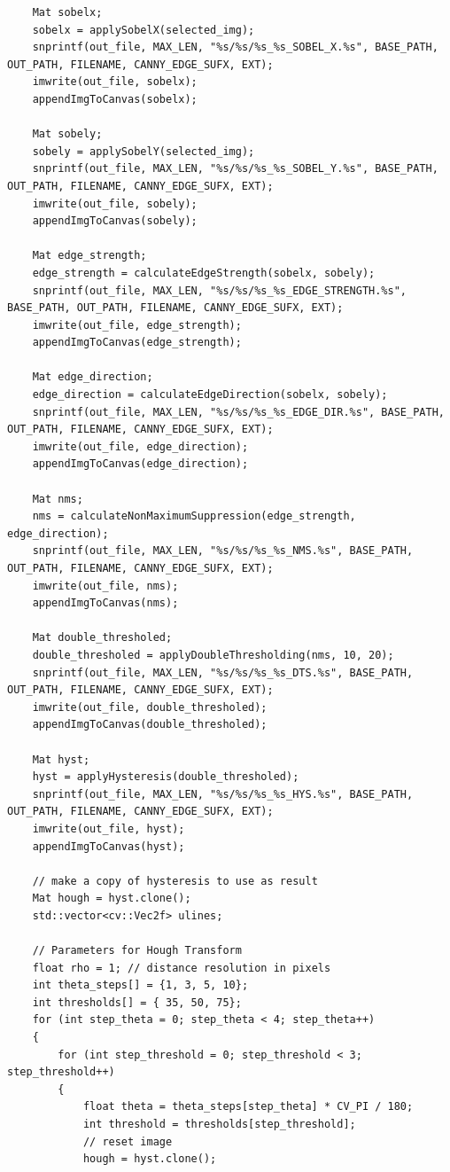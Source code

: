 \documentclass[12pt,a4paper]{report}
\begin{document}
\begin{lstlisting}
    Mat sobelx;
    sobelx = applySobelX(selected_img);
    snprintf(out_file, MAX_LEN, "%s/%s/%s_%s_SOBEL_X.%s", BASE_PATH, OUT_PATH, FILENAME, CANNY_EDGE_SUFX, EXT);
    imwrite(out_file, sobelx);
    appendImgToCanvas(sobelx);

    Mat sobely;
    sobely = applySobelY(selected_img);
    snprintf(out_file, MAX_LEN, "%s/%s/%s_%s_SOBEL_Y.%s", BASE_PATH, OUT_PATH, FILENAME, CANNY_EDGE_SUFX, EXT);
    imwrite(out_file, sobely);
    appendImgToCanvas(sobely);

    Mat edge_strength;
    edge_strength = calculateEdgeStrength(sobelx, sobely);
    snprintf(out_file, MAX_LEN, "%s/%s/%s_%s_EDGE_STRENGTH.%s", BASE_PATH, OUT_PATH, FILENAME, CANNY_EDGE_SUFX, EXT);
    imwrite(out_file, edge_strength);
    appendImgToCanvas(edge_strength);

    Mat edge_direction;
    edge_direction = calculateEdgeDirection(sobelx, sobely);
    snprintf(out_file, MAX_LEN, "%s/%s/%s_%s_EDGE_DIR.%s", BASE_PATH, OUT_PATH, FILENAME, CANNY_EDGE_SUFX, EXT);
    imwrite(out_file, edge_direction);
    appendImgToCanvas(edge_direction);

    Mat nms;
    nms = calculateNonMaximumSuppression(edge_strength, edge_direction);
    snprintf(out_file, MAX_LEN, "%s/%s/%s_%s_NMS.%s", BASE_PATH, OUT_PATH, FILENAME, CANNY_EDGE_SUFX, EXT);
    imwrite(out_file, nms);
    appendImgToCanvas(nms);

    Mat double_thresholed;
    double_thresholed = applyDoubleThresholding(nms, 10, 20);
    snprintf(out_file, MAX_LEN, "%s/%s/%s_%s_DTS.%s", BASE_PATH, OUT_PATH, FILENAME, CANNY_EDGE_SUFX, EXT);
    imwrite(out_file, double_thresholed);
    appendImgToCanvas(double_thresholed);

    Mat hyst;
    hyst = applyHysteresis(double_thresholed);
    snprintf(out_file, MAX_LEN, "%s/%s/%s_%s_HYS.%s", BASE_PATH, OUT_PATH, FILENAME, CANNY_EDGE_SUFX, EXT);
    imwrite(out_file, hyst);
    appendImgToCanvas(hyst);

    // make a copy of hysteresis to use as result
    Mat hough = hyst.clone();
    std::vector<cv::Vec2f> ulines;

    // Parameters for Hough Transform
    float rho = 1; // distance resolution in pixels
    int theta_steps[] = {1, 3, 5, 10};
    int thresholds[] = { 35, 50, 75};
    for (int step_theta = 0; step_theta < 4; step_theta++)
    {
        for (int step_threshold = 0; step_threshold < 3; step_threshold++)
        {
            float theta = theta_steps[step_theta] * CV_PI / 180;
            int threshold = thresholds[step_threshold];
            // reset image
            hough = hyst.clone();


\end{lstlisting}
\end{document}
